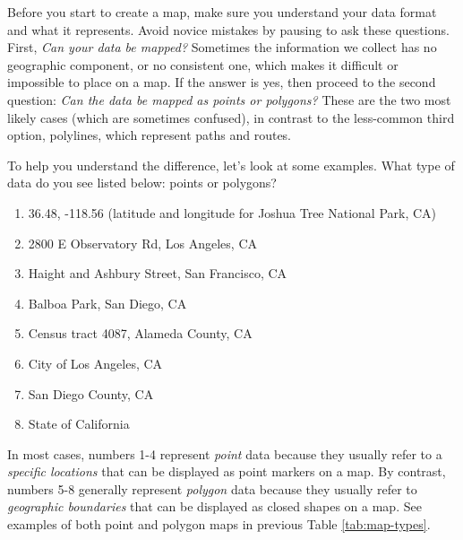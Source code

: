 \documentclass[
  english,
]{book}
\providecommand{\tightlist}{%
  \setlength{\itemsep}{0pt}\setlength{\parskip}{0pt}}
\begin{document}
Before you start to create a map, make sure you understand your data format and what it represents. Avoid novice mistakes by pausing to ask these questions. First, \emph{Can your data be mapped?} Sometimes the information we collect has no geographic component, or no consistent one, which makes it difficult or impossible to place on a map. If the answer is yes, then proceed to the second question: \emph{Can the data be mapped as points or polygons?} These are the two most likely cases (which are sometimes confused), in contrast to the less-common third option, polylines, which represent paths and routes.

To help you understand the difference, let's look at some examples. What type of data do you see listed below: points or polygons?

\begin{enumerate}
\def\labelenumi{\arabic{enumi}.}
\tightlist
\item
  36.48, -118.56 (latitude and longitude for Joshua Tree National Park, CA)
\item
  2800 E Observatory Rd, Los Angeles, CA
\item
  Haight and Ashbury Street, San Francisco, CA
\item
  Balboa Park, San Diego, CA
\item
  Census tract 4087, Alameda County, CA
\item
  City of Los Angeles, CA
\item
  San Diego County, CA
\item
  State of California
\end{enumerate}

In most cases, numbers 1-4 represent \emph{point} data because they usually refer to a \emph{specific locations} that can be displayed as point markers on a map. By contrast, numbers 5-8 generally represent \emph{polygon} data because they usually refer to \emph{geographic boundaries} that can be displayed as closed shapes on a map. See examples of both point and polygon maps in previous Table \ref{tab:map-types}.
\end{document}
